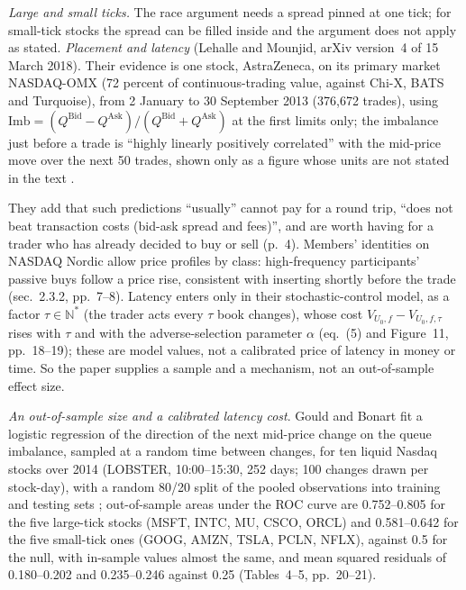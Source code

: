 \begin{qfdefinition}
\emph{Large and small ticks.} The race argument needs a spread pinned at one tick; for small-tick stocks the spread can be filled inside and the argument does not apply as stated. \emph{Placement and latency} (Lehalle and Mounjid, arXiv version~4 of 15 March 2018). Their evidence is one stock, AstraZeneca, on its primary market NASDAQ-OMX (72 percent of continuous-trading value, against Chi-X, BATS and Turquoise), from 2 January to 30 September 2013 (376,672 trades), using $\mathrm{Imb}=(Q^{\text{Bid}}-Q^{\text{Ask}})/(Q^{\text{Bid}}+Q^{\text{Ask}})$ at the first limits only; the imbalance just before a trade is ``highly linearly positively correlated'' with the mid-price move over the next 50 trades, shown only as a figure whose units are not stated in the text \citep[secs.~2.1--2.2, Table~1 and Figure~1, pp.~3--5]{wide-lehalle-mounjid}.

They add that such predictions ``usually'' cannot pay for a round trip, ``does not beat transaction costs (bid-ask spread and fees)'', and are worth having for a trader who has already decided to buy or sell (p.~4). Members' identities on NASDAQ Nordic allow price profiles by class: high-frequency participants' passive buys follow a price rise, consistent with inserting shortly before the trade (sec.~2.3.2, pp.~7--8). Latency enters only in their stochastic-control model, as a factor $\tau\in\mathbb N^*$ (the trader acts every $\tau$ book changes), whose cost $V_{U_0,f}-V_{U_0,f,\tau}$ rises with $\tau$ and with the adverse-selection parameter $\alpha$ (eq.~(5) and Figure~11, pp.~18--19); these are model values, not a calibrated price of latency in money or time. So the paper supplies a sample and a mechanism, not an out-of-sample effect size.

\emph{An out-of-sample size and a calibrated latency cost}. Gould and Bonart fit a logistic regression of the direction of the next mid-price change on the queue imbalance, sampled at a random time between changes, for ten liquid Nasdaq stocks over 2014 (LOBSTER, 10:00--15:30, 252 days; 100 changes drawn per stock-day), with a random 80/20 split of the pooled observations into training and testing sets \citep[arXiv v1, 11 December 2015, secs.~4--5.2, pp.~9--12]{gould-bonart-2015}; out-of-sample areas under the ROC curve are 0.752--0.805 for the five large-tick stocks (MSFT, INTC, MU, CSCO, ORCL) and 0.581--0.642 for the five small-tick ones (GOOG, AMZN, TSLA, PCLN, NFLX), against 0.5 for the null, with in-sample values almost the same, and mean squared residuals of 0.180--0.202 and 0.235--0.246 against 0.25 (Tables~4--5, pp.~20--21).


\end{qfdefinition}
